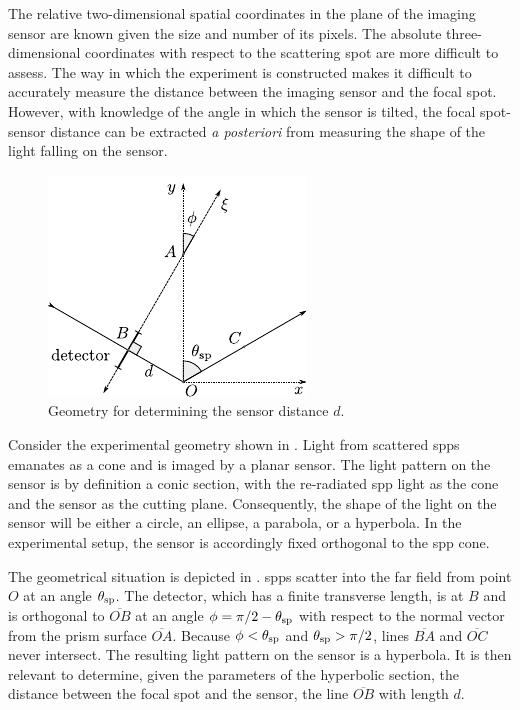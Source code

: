 The relative two-dimensional spatial coordinates in the plane of the
imaging sensor are known given the size and number of its pixels.  The
absolute three-dimensional coordinates with respect to the scattering spot
are more difficult to assess.  The way in which the experiment is
constructed makes it difficult to accurately measure the distance between
the imaging sensor and the focal spot.  However, with knowledge of the
angle in which the sensor is tilted, the focal spot-sensor distance can be extracted
\textit{a posteriori} from measuring the shape of the light falling on the
sensor.
\begin{figure}[ht]
\centering
\includegraphics[keepaspectratio,scale=1.25]{figures/hyperbolageoa.pdf}
\caption{Geometry for determining the sensor distance $d$.}
\label{fig:propgeo}
\end{figure}

Consider the experimental geometry shown in .
Light from scattered \glspl{spp} emanates as a cone and is imaged by a planar
sensor.  The light pattern on the sensor is by definition a conic section,
with the re-radiated \gls{spp} light as the cone and the sensor as the cutting
plane.  Consequently, the shape of the light on the sensor will be either a
circle, an ellipse, a parabola, or a hyperbola.  In the experimental setup,
the sensor is accordingly fixed orthogonal to the \gls{spp} cone.

The geometrical situation is depicted in .  \glspl{spp}
scatter into the far field from point $O$ at an angle $\theta_\mathrm{sp}$.  The
detector, which has a finite transverse length, is at $B$ and is orthogonal
to $\overline{OB}$ at an angle $\phi=\pi/2-\theta_\mathrm{sp}$ with respect to the
normal vector from the prism surface $\overline{OA}$.  Because
$\phi<\theta_\mathrm{sp}$ and $\theta_\mathrm{sp}>\pi/2$, lines $\overline{BA}$ and
$\overline{OC}$ never intersect. The resulting light pattern on the sensor is a hyperbola.  It is
then relevant to determine, given the parameters of the hyperbolic section,
the distance between the focal spot and the sensor, the line
$\overline{OB}$ with length $d$.

